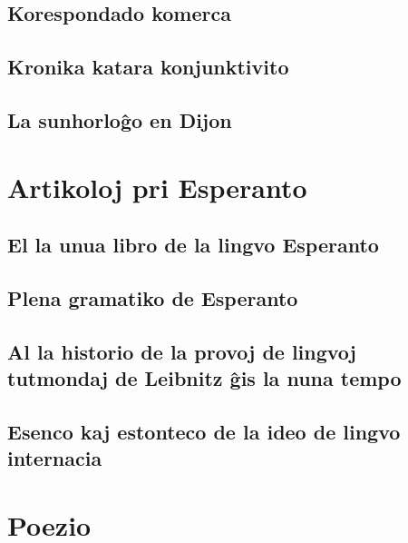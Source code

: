 \documentclass[a5paper,11pt,openany,twoside,leqno]{book}
\begin{document}
\section{Korespondado komerca}
\label{komerca}


\section{Kronika katara konjunktivito}
\label{kronika}


\section{La sunhorlo\^go en Dijon}
\label{dijon}


%
%
\chapter{Artikoloj pri Esperanto}
\section{El la unua libro de la lingvo Esperanto}
\label{unualibro}


\section{Plena gramatiko de Esperanto}
\label{plena}


\section[Al la historio de la provoj de lingvoj]{Al la historio de la provoj
de lingvoj tutmondaj de Leibnitz \^gis la  nuna tempo}
\label{leibnitz}


\section[Esenco kaj estonteco de la ideo de lingvo]{Esenco kaj estonteco de
la ideo de lingvo internacia}
\label{esenco}


%
%
\chapter{Poezio}
\end{document}
